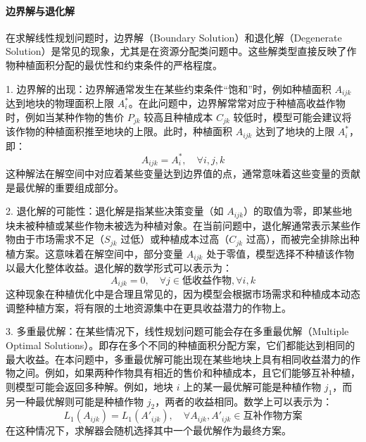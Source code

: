 \documentclass[12pt,a4paper]{nmmcm}
\begin{document}


\paragraph{边界解与退化解}

在求解线性规划问题时，边界解（Boundary Solution）和退化解（Degenerate Solution）是常见的现象，尤其是在资源分配类问题中。这些解类型直接反映了作物种植面积分配的最优性和约束条件的严格程度。

1. 边界解的出现：边界解通常发生在某些约束条件“饱和”时，例如种植面积 $A_{ijk}$ 达到地块的物理面积上限 $A_i^*$。在此问题中，边界解常常对应于种植高收益作物时，例如当某种作物的售价 $P_{jk}$ 较高且种植成本 $C_{jk}$ 较低时，模型可能会建议将该作物的种植面积推至地块的上限。此时，种植面积 $A_{ijk}$ 达到了地块的上限 $A_i^*$，即：
\[
  A_{ijk} = A_i^*, \quad \forall i, j, k
\]
这种解法在解空间中对应着某些变量达到边界值的点，通常意味着这些变量的贡献是最优解的重要组成部分。

2. 退化解的可能性：退化解是指某些决策变量（如 $A_{ijk}$）的取值为零，即某些地块未被种植或某些作物未被选为种植对象。在当前问题中，退化解通常表示某些作物由于市场需求不足（$S_{jk}$ 过低）或种植成本过高（$C_{jk}$ 过高），而被完全排除出种植方案。这意味着在解空间中，部分变量 $A_{ijk}$ 处于零值，模型选择不种植该作物以最大化整体收益。退化解的数学形式可以表示为：
\[
  A_{ijk} = 0, \quad \forall j \in \text{低收益作物}, \forall i, k
\]
这种现象在种植优化中是合理且常见的，因为模型会根据市场需求和种植成本动态调整种植方案，将有限的土地资源集中在更具收益潜力的作物上。

3. 多重最优解：在某些情况下，线性规划问题可能会存在多重最优解（Multiple Optimal Solutions）。即存在多个不同的种植面积分配方案，它们都能达到相同的最大收益。在本问题中，多重最优解可能出现在某些地块上具有相同收益潜力的作物之间。例如，如果两种作物具有相近的售价和种植成本，且它们能够互补种植，则模型可能会返回多种解。例如，地块 $i$ 上的某一最优解可能是种植作物 $j_1$，而另一种最优解则可能是种植作物 $j_2$，两者的收益相同。数学上可以表示为：
\[
  L_1(A_{ijk}) = L_1(A'_{ijk}), \quad \forall A_{ijk}, A'_{ijk} \in \text{互补作物方案}
\]
在这种情况下，求解器会随机选择其中一个最优解作为最终方案。
\end{document}
